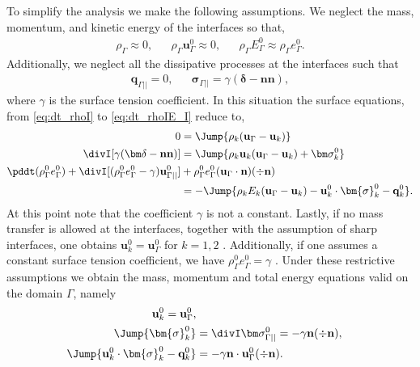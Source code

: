 To simplify the analysis we make the following assumptions. 
We neglect the mass, momentum, and kinetic energy of the interfaces so that,
\begin{align*}
    \rho_\Gamma \approx 0,
    &&
    \rho_\Gamma \textbf{u}_\Gamma^0 \approx 0,
    &&
    \rho_\Gamma E_\Gamma^0 \approx \rho_\Gamma e_\Gamma^0. 
\end{align*}
Additionally, we neglect all the dissipative processes at the interfaces such that
\begin{align*}
    \textbf{q}_{\Gamma||} = 0,
    &&
    \bm\sigma_{\Gamma||} = \gamma (\bm\delta  - \textbf{nn}),
\end{align*}
where $\gamma$ is the surface tension coefficient. 
In this situation the surface equations, from \ref{eq:dt_rhoI} to \ref{eq:dt_rhoIE_I} reduce to, 
\begin{align}
    0&= 
    \Jump{
        \rho_k (\textbf{u}_\Gamma - \textbf{u}_k)
    }
    \\
    \divI [\gamma ( \bm\delta - \textbf{nn})]
    &= 
    \Jump{
        \rho_k \textbf{u}_k (\textbf{u}_\Gamma - \textbf{u}_k)
        + \bm\sigma^0_k
    }
    \\
    \pddt (\rho_\Gamma^0e_\Gamma^0)  
    + \divI [
        (\rho_\Gamma^0 e_\Gamma^0 - \gamma)
         \textbf{u}_{\Gamma||}^0
        ]
    &+ \rho_\Gamma^0e_\Gamma^0  (\textbf{u}_\Gamma \cdot \textbf{n})(\div \textbf{n}) \nonumber\\
    &= 
    -\Jump{
        \rho_k E_k (\textbf{u}_\Gamma - \textbf{u}_k)
        - \textbf{u}_k^0 \cdot \bm{\sigma}_k^0 - \textbf{q}_k^0
    }. 
\end{align} 
At this point note that the coefficient $\gamma$ is not a constant. 
Lastly, if no mass transfer is allowed at the interfaces, together with the assumption of sharp interfaces, one obtains $\textbf{u}_k^0 = \textbf{u}_\Gamma^0$ for $k = 1,2$ \citep[chapter 2]{tryggvason2011direct}. 
Additionally, if one assumes a constant surface tension coefficient, we have $\rho_\Gamma^0 e_\Gamma^0 = \gamma$ \citep{ishii2010thermo}.  
Under these restrictive assumptions we obtain the mass, momentum and total energy equations valid on the domain $\Gamma$, namely
\begin{align}
    \label{eq:dt_rho_I}
    \textbf{u}_k^0 = \textbf{u}_\Gamma^0, \\
    \Jump{\bm{\sigma}_k^0} 
    &=
    \divI\bm\sigma^0_{\Gamma||}
    =
    -\gamma\textbf{n}(\div \textbf{n}),
    \label{eq:surface_tension}\\
    \label{eq:dt_rhoI_EI}
    \Jump{\textbf{u}_k^0 \cdot \bm{\sigma}_k^0 - \textbf{q}_k^0}
    &=
    -\gamma\textbf{n}\cdot \textbf{u}_{\Gamma}^0(\div \textbf{n}).
\end{align}
